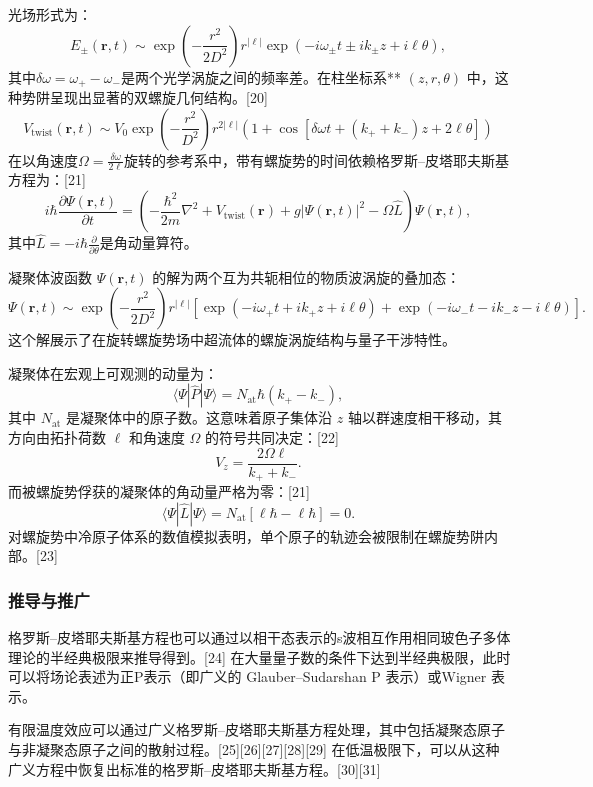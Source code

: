 光场形式为：
$$
E_{\pm}(\mathbf{r}, t) \sim \exp\left( -\frac{r^2}{2D^2} \right) r^{|\ell|} \exp\left( -i \omega_{\pm} t \pm i k_{\pm} z + i \ell \theta \right),~
$$
其中$\delta \omega = \omega_+ - \omega_-$是两个光学涡旋之间的频率差。在柱坐标系** $(z, r, \theta)$ 中，这种势阱呈现出显著的双螺旋几何结构。[20]
$$
V_{\text{twist}}(\mathbf{r}, t) \sim V_0 \exp\left(-\frac{r^2}{D^2}\right) r^{2|\ell|} \left(1 + \cos[\delta\omega t + (k_+ + k_-)z + 2\ell \theta] \right)~
$$
在以角速度$\Omega = \frac{\delta\omega}{2\ell}$旋转的参考系中，带有螺旋势的时间依赖格罗斯–皮塔耶夫斯基方程为：[21]
$$
i\hbar \frac{\partial \Psi(\mathbf{r}, t)}{\partial t} = \left( -\frac{\hbar^2}{2m} \nabla^2 + V_{\text{twist}}(\mathbf{r}) + g |\Psi(\mathbf{r}, t)|^2 - \Omega \hat{L} \right) \Psi(\mathbf{r}, t),~
$$
其中$\hat{L} = -i\hbar \frac{\partial}{\partial \theta}$是角动量算符。

凝聚体波函数 $\Psi(\mathbf{r}, t)$ 的解为两个互为共轭相位的物质波涡旋的叠加态：
$$
\Psi(\mathbf{r}, t) \sim \exp\left(-\frac{r^2}{2D^2}\right) r^{|\ell|} \left[ \exp(-i\omega_+ t + i k_+ z + i\ell \theta) + \exp(-i\omega_- t - i k_- z - i\ell \theta) \right].~
$$
这个解展示了在旋转螺旋势场中超流体的螺旋涡旋结构与量子干涉特性。

凝聚体在宏观上可观测的动量为：
$$
\langle \Psi | \hat{P} | \Psi \rangle = N_{\text{at}} \hbar (k_+ - k_-),~
$$
其中 $N_{\text{at}}$ 是凝聚体中的原子数。这意味着原子集体沿 $z$ 轴以群速度相干移动，其方向由拓扑荷数 $\ell$ 和角速度 $\Omega$ 的符号共同决定：[22]
$$
V_z = \frac{2 \Omega \ell}{k_+ + k_-}.~
$$
而被螺旋势俘获的凝聚体的角动量严格为零：[21]
$$
\langle \Psi | \hat{L} | \Psi \rangle = N_{\text{at}} [\ell \hbar - \ell \hbar] = 0.~
$$
对螺旋势中冷原子体系的数值模拟表明，单个原子的轨迹会被限制在螺旋势阱内部。[23]
\subsubsection{推导与推广}
格罗斯–皮塔耶夫斯基方程也可以通过以相干态表示的s波相互作用相同玻色子多体理论的半经典极限来推导得到。[24] 在大量量子数的条件下达到半经典极限，此时可以将场论表述为正P表示（即广义的 Glauber–Sudarshan P 表示）或Wigner 表示。

有限温度效应可以通过广义格罗斯–皮塔耶夫斯基方程处理，其中包括凝聚态原子与非凝聚态原子之间的散射过程。[25][26][27][28][29] 在低温极限下，可以从这种广义方程中恢复出标准的格罗斯–皮塔耶夫斯基方程。[30][31]
